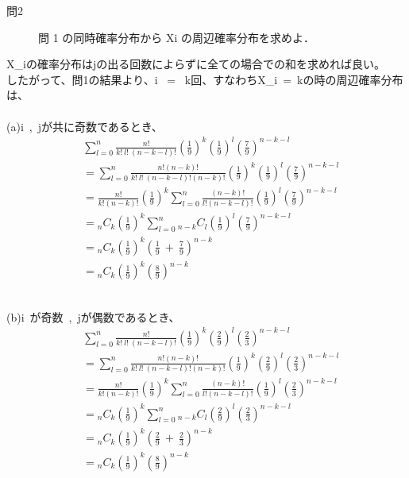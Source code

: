 \documentclass[12pt,a4paper]{jsarticle}
\begin{document}
\begin{description}
    \item [問2] 問 1 の同時確率分布から Xi の周辺確率分布を求めよ．
\end{description}

X_{i}の確率分布はjの出る回数によらずに全ての場合での和を求めれば良い。\\
したがって、問1の結果より、i ~=~ k回、すなわちX_{i}~=~kの時の周辺確率分布は、\\

~\\
(a)i~,~jが共に奇数であるとき、\\
\begin{align*}
    & \sum^n_{l = 0} \frac{n!}{k!~l!~(n-k-l)!} \left(\frac{1}{9}\right)^k \left(\frac{1}{9}\right)^l \left(\frac{7}{9}\right)^{n-k-l} \\
    &= \sum^n_{l = 0} \frac{n!(n-k)!}{k!~l!~(n-k-l)!(n-k)!} \left(\frac{1}{9}\right)^k \left(\frac{1}{9}\right)^l \left(\frac{7}{9}\right)^{n-k-l} \\
    &= \frac{n!}{k!(n-k)!}\left(\frac{1}{9}\right)^k \sum^n_{l = 0}\frac{(n-k)!}{l!(n-k-l)!}\left(\frac{1}{9}\right)^l\left(\frac{7}{9}\right)^{n-k-l} \\
    &= {}_n C_k \left(\frac{1}{9}\right)^k \sum^n_{l = 0} {}_{n-k} C_l \left(\frac{1}{9}\right)^l\left(\frac{7}{9}\right)^{n-k-l} \\
    &= {}_n C_k \left(\frac{1}{9}\right)^k \left(\frac{1}{9}~+~\frac{7}{9}\right)^{n-k} \\
    &= {}_n C_k \left(\frac{1}{9}\right)^k \left(\frac{8}{9}\right)^{n-k}
\end{align*}

~\\
(b)i~が奇数~,~jが偶数であるとき、\\
\begin{align*}
    & \sum^n_{l = 0} \frac{n!}{k!~l!~(n-k-l)!} \left(\frac{1}{9}\right)^k \left(\frac{2}{9}\right)^l \left(\frac{2}{3}\right)^{n-k-l} \\
    &= \sum^n_{l = 0} \frac{n!(n-k)!}{k!~l!~(n-k-l)!(n-k)!} \left(\frac{1}{9}\right)^k \left(\frac{2}{9}\right)^l \left(\frac{2}{3}\right)^{n-k-l} \\
    &= \frac{n!}{k!(n-k)!}\left(\frac{1}{9}\right)^k \sum^n_{l = 0}\frac{(n-k)!}{l!(n-k-l)!}\left(\frac{1}{9}\right)^l\left(\frac{2}{3}\right)^{n-k-l} \\
    &= {}_n C_k \left(\frac{1}{9}\right)^k \sum^n_{l = 0} {}_{n-k} C_l \left(\frac{2}{9}\right)^l\left(\frac{2}{3}\right)^{n-k-l} \\
    &= {}_n C_k \left(\frac{1}{9}\right)^k \left(\frac{2}{9}~+~\frac{2}{3}\right)^{n-k} \\
    &= {}_n C_k \left(\frac{1}{9}\right)^k \left(\frac{8}{9}\right)^{n-k}
\end{align*}
\end{document}
